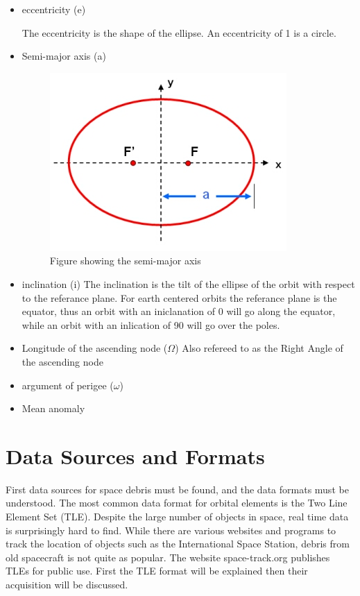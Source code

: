 \documentclass[12pt]{article}
\begin{document}
	\begin{itemize}
		\item eccentricity (e)
		
		The eccentricity is the shape of the ellipse. An eccentricity of 1 is a circle.
		\item Semi-major axis (a)
		\begin{figure}
			\centering
			\includegraphics[width=0.7\linewidth]{semi_majoraxis}
			\caption{Figure showing the semi-major axis\cite{semMaxis}}
			\label{fig:semimajoraxis}
		\end{figure}
		
		\item inclination (i)
		The inclination is the tilt of the ellipse of the orbit with respect to the referance plane. For earth centered orbits the referance plane is the equator, thus an orbit with an iniclanation of 0 will go along the equator, while an orbit with an inlication of 90 will go over the poles. 
		\item Longitude of the ascending node ($\Omega$)
		Also refereed to as the Right Angle of the ascending node 
		\item argument of perigee ($\omega$)
		\item Mean anomaly
	\end{itemize}

\fi	

	
	\newpage
	\section{Data Sources and Formats}
	
	
	
	First data sources for space debris must be found, and the data formats must be understood. The most common data format for orbital elements is the Two Line Element Set (TLE). Despite the large number of objects in space, real time data is surprisingly hard to find. While there are various websites and programs to track the location of objects such as the International Space Station, debris from old spacecraft is not quite as popular. The website space-track.org publishes TLEs for public use. First the TLE format will be explained then their acquisition will be discussed. 
	
\end{document}
